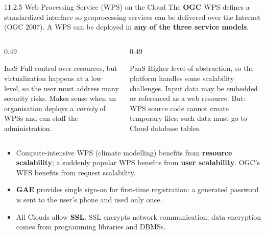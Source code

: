 \documentclass[11pt,aspectratio=169]{beamer}
\newcommand{\kw}[1]{\textbf{\color{accent}#1}}
\begin{document}
\begin{frame}{11.2.5 Web Processing Service (WPS) on the Cloud}
  \small
  The \kw{OGC} WPS defines a standardized interface so geoprocessing services
  can be delivered over the Internet (OGC 2007). A WPS can be deployed in
  \kw{any of the three service models}.
  \vspace{0.7em}

  \begin{columns}[T,onlytextwidth]
    \begin{column}{0.49\textwidth}
      \begin{block}{IaaS}
        \scriptsize
        Full control over resources, but virtualization happens at a low level,
        so the user must address many security risks. Makes sense when an
        organisation deploys a \emph{variety} of WPSs and can staff the
        administration.
      \end{block}
    \end{column}
    \begin{column}{0.49\textwidth}
      \begin{block}{PaaS}
        \scriptsize
        Higher level of abstraction, so the platform handles some scalability
        challenges. Input data may be embedded or referenced as a web resource.
        \alert{But:} WPS source code cannot create temporary files; such data
        must go to Cloud database tables.
      \end{block}
    \end{column}
  \end{columns}
  \vspace{0.8em}

  \begin{itemize}\scriptsize\setlength{\itemsep}{0.28em}
    \item Compute-intensive WPS (climate modelling) benefits from
          \kw{resource scalability}; a suddenly popular WPS benefits from
          \kw{user scalability}. OGC's WFS benefits from request scalability.
    \item \kw{GAE} provides single sign-on for first-time registration: a
          generated password is sent to the user's phone and used only once.
    \item All Clouds allow \kw{SSL}. SSL encrypts network communication; data
          encryption comes from programming libraries and DBMSs.
  \end{itemize}
\end{frame}
\end{document}
